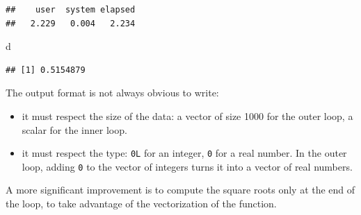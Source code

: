 \documentclass[
  12pt,
  american,
  a4paper,
  extrafontsizes,onecolumn,openright
  ]{memoir}
\newenvironment{Shaded}{\begin{snugshade}}{\end{snugshade}}
\newcommand{\AttributeTok}[1]{\textcolor[rgb]{0.13,0.29,0.53}{#1}}
\newcommand{\ControlFlowTok}[1]{\textcolor[rgb]{0.13,0.29,0.53}{\textbf{#1}}}
\newcommand{\DecValTok}[1]{\textcolor[rgb]{0.00,0.00,0.81}{#1}}
\newcommand{\FunctionTok}[1]{\textcolor[rgb]{0.13,0.29,0.53}{\textbf{#1}}}
\newcommand{\NormalTok}[1]{#1}
\newcommand{\OtherTok}[1]{\textcolor[rgb]{0.56,0.35,0.01}{#1}}
\newcommand{\SpecialCharTok}[1]{\textcolor[rgb]{0.81,0.36,0.00}{\textbf{#1}}}
\providecommand{\tightlist}{%
  \setlength{\itemsep}{0pt}\setlength{\parskip}{0pt}}
\begin{document}
\begin{verbatim}
##    user  system elapsed 
##   2.229   0.004   2.234
\end{verbatim}

\begin{Shaded}
\begin{Highlighting}[]
\NormalTok{d}
\end{Highlighting}
\end{Shaded}

\begin{verbatim}
## [1] 0.5154879
\end{verbatim}

\normalsize

The output format is not always obvious to write:

\begin{itemize}
\tightlist
\item
  it must respect the size of the data: a vector of size 1000 for the outer loop, a scalar for the inner loop.
\item
  it must respect the type: \texttt{0L} for an integer, \texttt{0} for a real number. In the outer loop, adding \texttt{0} to the vector of integers turns it into a vector of real numbers.
\end{itemize}

A more significant improvement is to compute the square roots only at the end of the loop, to take advantage of the vectorization of the function.

\scriptsize

\begin{Shaded}
\end{Shaded}
\end{document}
